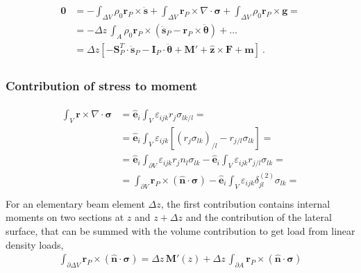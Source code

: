 \documentclass[letterpaper,10pt,english]{jupyterBook}
\begin{document}
\begin{equation*}
\begin{split}\begin{aligned}
  \mathbf{0} 
& = - \int_{\Delta V} \rho_0 \mathbf{r}_P \times \ddot{\mathbf{s}} + \int_{\Delta V} \mathbf{r}_P \times \nabla \cdot \boldsymbol\sigma + \int_{\Delta V} \rho_0 \mathbf{r}_P \times \mathbf{g} = \\
& = - \Delta z \, \int_{A} \rho_0 \mathbf{r}_P \times \left( \ddot{\mathbf{s}}_P - \mathbf{r}_P \times \ddot{\boldsymbol{\theta}} \right)
    + \dots \\
& = \Delta z \left[ - \mathbf{S}_P^T \cdot \ddot{\mathbf{s}}_P - \mathbf{I}_{P} \cdot \ddot{\boldsymbol\theta} + \mathbf{M}' + \hat{\mathbf{z}} \times \mathbf{F} + \mathbf{m} \right] \ .
\end{aligned}\end{split}
\end{equation*}\subsubsection*{Contribution of stress to moment}
\begin{equation*}
\begin{split}\begin{aligned}
  \int_{V} \mathbf{r} \times \nabla \cdot \boldsymbol\sigma 
  & = \hat{\mathbf{e}}_i \int_{V} \varepsilon_{ijk} r_j \sigma_{lk/l} = \\
  & = \hat{\mathbf{e}}_i \int_{V} \varepsilon_{ijk} \left[  \left( r_j \sigma_{lk} \right)_{/l} - r_{j/l} \sigma_{lk} \right] = \\
  & = \hat{\mathbf{e}}_i \int_{\partial V} \varepsilon_{ijk} r_j n_l  \sigma_{lk} - \hat{\mathbf{e}}_i \int_{V} \varepsilon_{ijk} r_{j/l} \sigma_{lk} = \\
  & = \int_{\partial V} \mathbf{r}_P \times ( \hat{\mathbf{n}} \cdot \boldsymbol\sigma ) - \hat{\mathbf{e}}_i \int_{V} \varepsilon_{ijk} \delta^{(2)}_{jl} \sigma_{lk} = \\
\end{aligned}\end{split}
\end{equation*}
\sphinxAtStartPar
For an elementary beam element \(\Delta z\), the first contribution contains internal moments on two sections at \(z\) and \(z+\Delta z\) and the contribution of the lateral surface, that can be summed with the volume contribution to get load from linear density loads,
\begin{equation*}
\begin{split}\int_{\partial \Delta V} \mathbf{r}_P \times ( \hat{\mathbf{n}} \cdot \boldsymbol\sigma ) 
 = \Delta z \, \mathbf{M}'(z) + \Delta z \, \int_{\partial A} \mathbf{r}_P \times ( \hat{\mathbf{n}} \cdot \boldsymbol\sigma )  \end{split}
\end{equation*}
\end{document}
